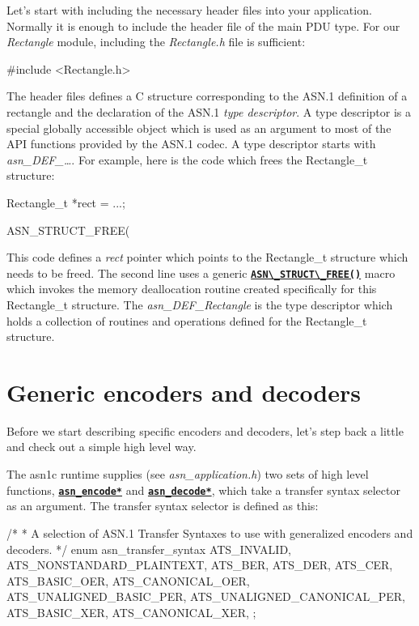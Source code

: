 \documentclass[english,oneside,12pt]{book}
\newcommand{\api}[2]{\hyperref[#1]{\code{#2}}}
\newcommand{\code}[1]{\texttt{\textbf{\lstinline{#1}}}}
\begin{document}
Let's start with including the necessary header files into your
application. Normally it is enough to include the header file of
the main PDU type. For our \emph{Rectangle} module, including the \emph{Rectangle.h} file is sufficient:
\begin{codesample}
#include <Rectangle.h>
\end{codesample}
The header files defines a C structure corresponding to the ASN.1
definition of a rectangle and the declaration of the ASN.1
\emph{type descriptor}. A type descriptor is a special globally accessible
object which is used as an argument to most of the API functions provided by
the ASN.1 codec. A type descriptor starts with \emph{asn\_DEF\_\ldots{}}. For example, here is the code which frees the Rectangle\_t structure:
\begin{codesample}
Rectangle_t *rect = ...;

ASN_STRUCT_FREE(%
\end{codesample}
This code defines a \emph{rect} pointer which points to the Rectangle\_t
structure which needs to be freed. The second line uses a generic
\api{sec:ASN_STRUCT_FREE}{ASN\_STRUCT\_FREE()} macro which invokes the memory deallocation routine
created specifically for this Rectangle\_t structure.
The \emph{asn\_DEF\_Rectangle} is the type descriptor which holds
a collection of routines and operations defined for the Rectangle\_t structure.

\section{\label{sec:Generic-Encoding}Generic encoders and decoders}

Before we start describing specific encoders and decoders, let's step back
a little and check out a simple high level way.

The asn1c runtime supplies (see \emph{asn\_application.h}) two sets of high level functions, \api{sec:asn_encode}{asn_encode*} and \api{sec:asn_decode}{asn_decode*}, which take a transfer syntax selector as an argument. The transfer syntax selector is defined as this:

\begin{codesample}[basicstyle=\scriptsize\listingfont]
/*
 * A selection of ASN.1 Transfer Syntaxes to use with generalized encoders and decoders.
 */
enum asn_transfer_syntax {
    ATS_INVALID,
    ATS_NONSTANDARD_PLAINTEXT,
    ATS_BER,
    ATS_DER,
    ATS_CER,
    ATS_BASIC_OER,
    ATS_CANONICAL_OER,
    ATS_UNALIGNED_BASIC_PER,
    ATS_UNALIGNED_CANONICAL_PER,
    ATS_BASIC_XER,
    ATS_CANONICAL_XER,
};
\end{codesample}
\end{document}
